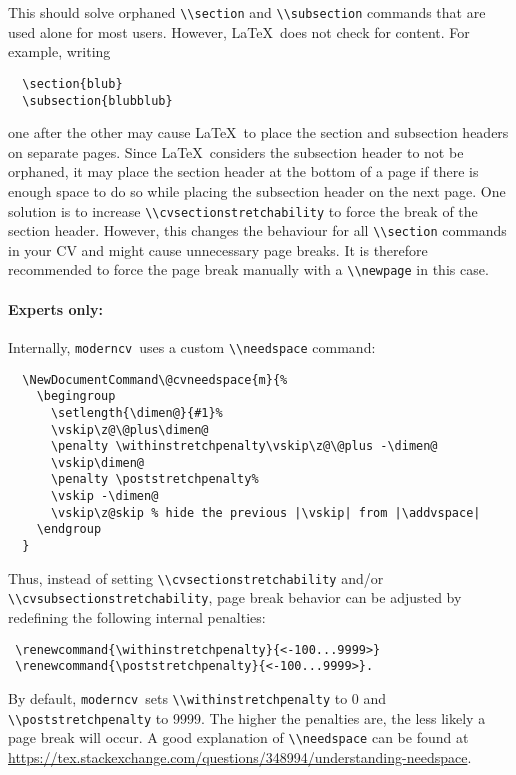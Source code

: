 \documentclass[a4paper, 11pt]{article}
\newcommand{\code}[1]{\lstinline!#1!}
\newcommand{\moderncv}{\code{moderncv}}
\newcommand{\Moderncv}{\moderncv~}
\newcommand{\Latex}{\LaTeX~}
\begin{document}
This should solve orphaned \code{\\section} and \code{\\subsection} commands that are used alone for most users.
However, \Latex does not check for content.
For example, writing
\begin{lstlisting}
  \section{blub}
  \subsection{blubblub}
\end{lstlisting}
one after the other may cause \Latex to place the section and subsection headers on separate pages.
Since \Latex considers the subsection header to not be orphaned, it may place the section header at the bottom of a page if there is enough space to do so while placing the subsection header on the next page.
One solution is to increase \code{\\cvsectionstretchability} to force the break of the section header.
However, this changes the behaviour for all \code{\\section} commands in your CV and might cause unnecessary page breaks.
It is therefore recommended to force the page break manually with a \code{\\newpage} in this case.

\paragraph{Experts only:}
Internally, \Moderncv uses a custom \code{\\needspace} command:
\begin{lstlisting}
  \NewDocumentCommand\@cvneedspace{m}{%
    \begingroup
      \setlength{\dimen@}{#1}%
      \vskip\z@\@plus\dimen@
      \penalty \withinstretchpenalty\vskip\z@\@plus -\dimen@
      \vskip\dimen@
      \penalty \poststretchpenalty%
      \vskip -\dimen@
      \vskip\z@skip % hide the previous |\vskip| from |\addvspace|
    \endgroup
  }
\end{lstlisting}
Thus, instead of setting \code{\\cvsectionstretchability} and/or \code{\\cvsubsectionstretchability}, page break behavior can be adjusted by redefining the following internal penalties:
\begin{lstlisting}
 \renewcommand{\withinstretchpenalty}{<-100...9999>}
 \renewcommand{\poststretchpenalty}{<-100...9999>}.
\end{lstlisting}
By default, \Moderncv sets \code{\\withinstretchpenalty} to 0 and \code{\\poststretchpenalty} to 9999.
The higher the penalties are, the less likely a page break will occur.
A good explanation of \code{\\needspace} can be found at \url{https://tex.stackexchange.com/questions/348994/understanding-needspace}.
\end{document}

